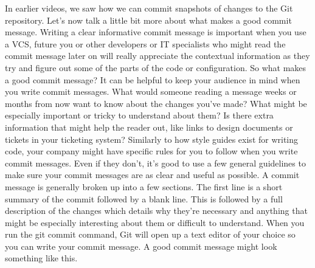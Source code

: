 	In earlier videos, we saw how we can commit snapshots of changes to the Git repository. Let's now talk a little bit more about what makes a good commit message. Writing a clear informative commit message is important when you use a VCS, future you or other developers or IT specialists who might read the commit message later on will really appreciate the contextual information as they try and figure out some of the parts of the code or configuration. So what makes a good commit message? It can be helpful to keep your audience in mind when you write commit messages. What would someone reading a message weeks or months from now want to know about the changes you've made? What might be especially important or tricky to understand about them? Is there extra information that might help the reader out, like links to design documents or tickets in your ticketing system? Similarly to how style guides exist for writing code, your company might have specific rules for you to follow when you write commit messages. Even if they don't, it's good to use a few general guidelines to make sure your commit messages are as clear and useful as possible. A commit message is generally broken up into a few sections. The first line is a short summary of the commit followed by a blank line. This is followed by a full description of the changes which details why they're necessary and anything that might be especially interesting about them or difficult to understand. When you run the git commit command, Git will open up a text editor of your choice so you can write your commit message. A good commit message might look something like this.
	
